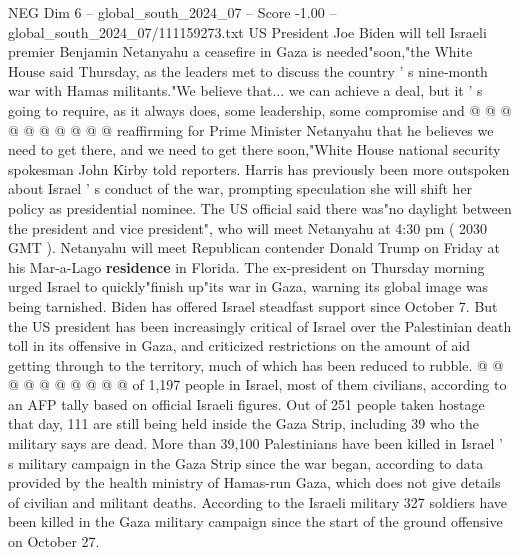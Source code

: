 \begin{textsample}{NEG Dim 6 – global\_south\_2024\_07 – Score -1.00 – global\_south\_2024\_07/111159273.txt}
US President Joe Biden will tell Israeli premier Benjamin Netanyahu a ceasefire in Gaza is needed"soon,"the White House said Thursday, as the leaders met to discuss the country ' s nine-month war with Hamas militants."We believe that... we can achieve a deal, but it ' s going to require, as it always does, some leadership, some compromise and @ @ @ @ @ @ @ @ @ @ reaffirming for Prime Minister Netanyahu that he believes we need to get there, and we need to get there soon,"White House national security spokesman John Kirby told reporters.
Harris has previously been more outspoken about Israel ' s conduct of the war, prompting speculation she will shift her policy as presidential nominee.
The US official said there was"no daylight between the president and vice president", who will meet Netanyahu at 4:30 pm ( 2030 GMT ).
Netanyahu will meet Republican contender Donald Trump on Friday at his Mar-a-Lago \textbf{residence} in Florida.
The ex-president on Thursday morning urged Israel to quickly"finish up"its war in Gaza, warning its global image was being tarnished.
Biden has offered Israel steadfast support since October 7.
But the US president has been increasingly critical of Israel over the Palestinian death toll in its offensive in Gaza, and criticized restrictions on the amount of aid getting through to the territory, much of which has been reduced to rubble. @ @ @ @ @ @ @ @ @ @ of 1,197 people in Israel, most of them civilians, according to an AFP tally based on official Israeli figures.
Out of 251 people taken hostage that day, 111 are still being held inside the Gaza Strip, including 39 who the military says are dead.
More than 39,100 Palestinians have been killed in Israel ' s military campaign in the Gaza Strip since the war began, according to data provided by the health ministry of Hamas-run Gaza, which does not give details of civilian and militant deaths.
According to the Israeli military 327 soldiers have been killed in the Gaza military campaign since the start of the ground offensive on October 27.

\end{textsample}
